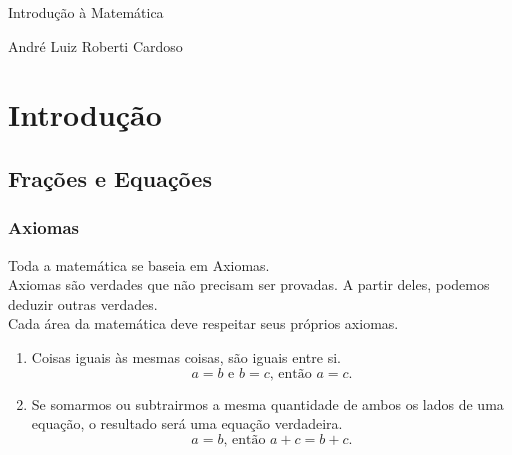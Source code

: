 \documentclass[12pt,a4paper]{article}
\begin{document}
\begin{titlepage} %
\begin{center}
\vspace*{\fill} %
\Huge Introdução à Matemática %
\vspace*{\fill}
\end{center}

\begin{flushright}
\normalsize André Luiz Roberti Cardoso %
\end{flushright}

\thispagestyle{empty} %
\end{titlepage}

\tableofcontents
\newpage %

\section{Introdução} %

\subsection{Frações e Equações} %

\subsubsection{Axiomas} %

Toda a matemática se baseia em Axiomas. \\
Axiomas são verdades que não precisam ser provadas. A partir deles, podemos deduzir outras verdades.\\
Cada área da matemática deve respeitar seus próprios axiomas.

\begin{enumerate}
    \item Coisas iguais às mesmas coisas, são iguais entre si.
    \[
    a = b \text{ e } b = c \text{, então } a = c.
    \]
    \item Se somarmos ou subtrairmos a mesma quantidade de ambos os lados de uma equação, o resultado será uma equação verdadeira.
    \[
    a = b \text{, então } a + c = b + c.
    \]
\end{enumerate}
\end{document}

